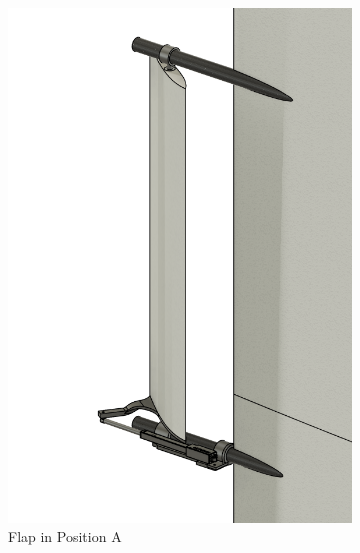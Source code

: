 \begin{figure}[H]
    \centering
    \begin{subfigure}[b]{0.28\linewidth}
        \centering
        \includegraphics[width=\linewidth]{assets/flap_tilt_1.png}
        \caption{Flap in Position A}
        \label{fig:flaptilt1}
    \end{subfigure}
    \hfill
    \begin{subfigure}[b]{0.28\linewidth}
        \centering

\end{subfigure}
\end{figure}
